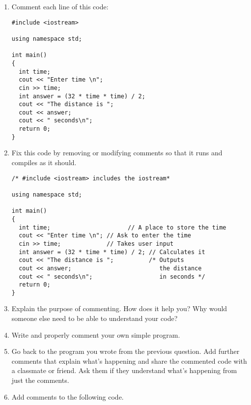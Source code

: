 \begin{enumerate}
\item Comment each line of this code: \nopagebreak[4]

\noindent\begin{minipage}{\linewidth}\begin{lstlisting}
#include <iostream>

using namespace std;

int main()
{
  int time;
  cout << "Enter time \n";
  cin >> time;
  int answer = (32 * time * time) / 2;
  cout << "The distance is ";
  cout << answer;
  cout << " seconds\n";
  return 0;
}
\end{lstlisting}\end{minipage}

\item Fix this code by removing or modifying comments so that it runs and compiles as it should.

\noindent\begin{minipage}{\linewidth}\begin{lstlisting}
/* #include <iostream> includes the iostream*

using namespace std;

int main()
{
  int time;				         // A place to store the time 
  cout << "Enter time \n"; // Ask to enter the time
  cin >> time;             // Takes user input
  int answer = (32 * time * time) / 2; // Calculates it
  cout << "The distance is ";          /* Outputs
  cout << answer;                         the distance
  cout << " seconds\n";                   in seconds */
  return 0;
}
\end{lstlisting}\end{minipage}

\item Explain the purpose of commenting. How does it help you? Why would someone else need to be able to understand your code?

\item Write and properly comment your own simple program.

\item Go back to the program you wrote from the previous question. Add further comments that explain what's happening and share the commented code with a classmate or friend. Ask them if they understand what's happening from just the comments.

\item Add comments to the following code. \nopagebreak[4]


\end{enumerate}
